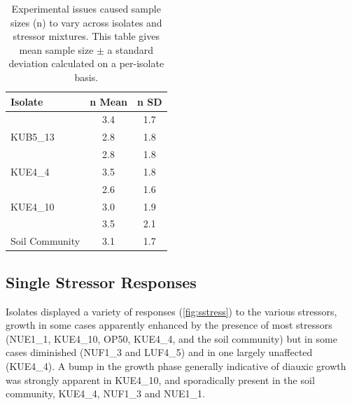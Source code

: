 \documentclass[final,1p,times]{elsarticle}
\begin{document}
\begin{table}[ht]
\centering
\small
\begin{tabular}{l c c}
\toprule 
\textbf{Isolate} & \textbf{n Mean} & \textbf{n SD}  \\
\midrule
\rowcolor{gggrey}{LUF4\_5} & 3.4 & 1.7 \\
{KUB5\_13} & 2.8 & 1.8 \\
\rowcolor{gggrey}{NUF1\_3} & 2.8 & 1.8\\
{KUE4\_4} & 3.5 & 1.8\\
\rowcolor{gggrey}{NUE1\_1} & 2.6 & 1.6\\
{KUE4\_10} & 3.0 & 1.9 \\
\rowcolor{gggrey}{OP50} & 3.5 & 2.1 \\
{Soil Community} & 3.1 & 1.7\\
\bottomrule
\end{tabular}
\caption{Experimental issues caused sample sizes (n) to vary across isolates and stressor mixtures. This table gives mean sample size $\pm$ a standard deviation calculated on a per-isolate basis.}
\label{tab:samples}
\end{table}

\newpage
\subsection{Single Stressor Responses}
\label{S:3:3}

Isolates displayed a variety of responses (\cref{fig:sstress}) to the various stressors, growth in some cases apparently enhanced by the presence of most stressors (NUE1\_1, KUE4\_10, OP50, KUE4\_4, and the soil community) but in some cases diminished (NUF1\_3 and LUF4\_5) and in one largely unaffected (KUE4\_4). A bump in  the growth phase generally indicative of diauxic growth was strongly apparent in KUE4\_10, and sporadically present in the soil community, KUE4\_4, NUF1\_3 and NUE1\_1. 
\end{document}
